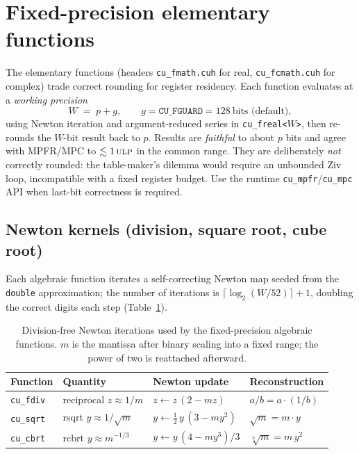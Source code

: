 \documentclass[11pt,a4paper]{article}
\newcommand{\code}[1]{\texttt{#1}}
\newcommand{\PB}{\ensuremath{p}}
\newcommand{\ulp}{\textsc{ulp}}
\begin{document}
\section{Fixed-precision elementary functions}
\label{sec:elem}

The elementary functions (headers \code{cu\_fmath.cuh} for real,
\code{cu\_fcmath.cuh} for complex) trade correct rounding for register residency.
Each function evaluates at a \emph{working precision}
\begin{equation}
W \;=\; \PB + g, \qquad g = \texttt{CU\_FGUARD} = 128~\text{bits (default)},
\end{equation}
using Newton iteration and argument-reduced series in \code{cu\_freal<$W$>}, then
re-rounds the $W$-bit result back to \PB. Results are \emph{faithful} to about
\PB{} bits and agree with MPFR/MPC to $\lesssim 1\,\ulp$ in the common range.
They are deliberately \emph{not} correctly rounded: the table-maker's dilemma
would require an unbounded Ziv loop, incompatible with a fixed register budget.
Use the runtime \code{cu\_mpfr}/\code{cu\_mpc} API when last-bit correctness is
required.

\subsection{Newton kernels (division, square root, cube root)}
Each algebraic function iterates a self-correcting Newton map seeded from the
\code{double} approximation; the number of iterations is
$\lceil\log_2(W/52)\rceil+1$, doubling the correct digits each step
(Table~\ref{tab:newton}).

\begin{table}[h]
\centering
\begin{tabular}{@{}llll@{}}
\toprule
Function & Quantity & Newton update & Reconstruction\\
\midrule
\code{cu\_fdiv}  & reciprocal $z\!\approx\!1/m$ & $z \leftarrow z\,(2 - m z)$ & $a/b = a\cdot(1/b)$\\
\code{cu\_sqrt}  & rsqrt $y\!\approx\!1/\sqrt m$ & $y \leftarrow \tfrac{1}{2}\,y\,(3 - m y^2)$ & $\sqrt m = m\cdot y$\\
\code{cu\_cbrt}  & rcbrt $y\!\approx\!m^{-1/3}$ & $y \leftarrow y\,(4 - m y^3)/3$ & $\sqrt[3]{m}=m\,y^2$\\
\bottomrule
\end{tabular}
\caption{Division-free Newton iterations used by the fixed-precision algebraic
functions. $m$ is the mantissa after binary scaling into a fixed range; the power
of two is reattached afterward.}
\label{tab:newton}
\end{table}
\end{document}
